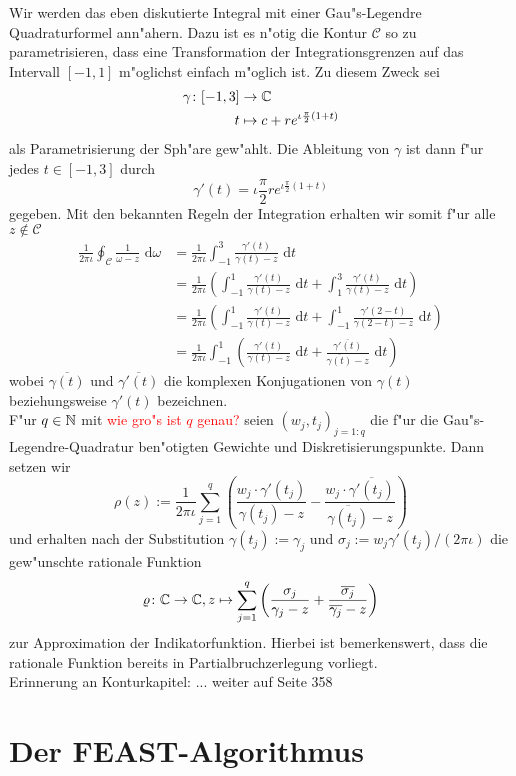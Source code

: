 Wir werden das eben diskutierte Integral mit einer Gau"s-Legendre Quadraturformel ann"ahern.
Dazu ist es n"otig die Kontur $\mathcal{C}$ so zu parametrisieren, dass eine Transformation
der Integrationsgrenzen auf das Intervall $[-1,1]$ m"oglichst einfach m"oglich ist. Zu diesem Zweck sei
\begin{align*}
\gamma\colon[-1,3]&\to\mathbb{C} \\
t&\mapsto c+re^{\iota \frac{\pi}{2}(1+t)}
\end{align*}
als Parametrisierung der Sph"are gew"ahlt. Die
Ableitung von $\gamma$ ist dann f"ur jedes $t\in[-1,3]$ durch
\[
\gamma'(t)=\iota \frac{\pi}{2}re^{\iota \frac{\pi}{2}(1+t)}
\]
gegeben. Mit den bekannten Regeln der Integration erhalten wir somit f"ur alle $z\notin\mathcal{C}$
\begin{align*}
\frac{1}{2\pi\iota}\oint_{ \mathcal{C}}\frac{1}{\omega-z}\text{ d}\omega
&= \frac{1}{2\pi\iota} \int_{-1}^3 \frac{\gamma'(t)}{\gamma(t)-z}\text{ d}t \\
&= \frac{1}{2\pi\iota} \left( \int_{-1}^1 \frac{\gamma'(t)}{\gamma(t)-z} \text{ d}t +
\int_{1}^3\frac{\gamma'(t)}{\gamma(t)-z}\text{ d}t \right) \\
&= \frac{1}{2\pi\iota} \left( \int_{-1}^1 \frac{\gamma'(t)}{\gamma(t)-z} \text{ d}t +
\int_{-1}^1\frac{\gamma'(2-t)}{\gamma(2-t)-z}\text{ d}t \right) \\
&= \frac{1}{2\pi\iota} \int_{-1}^1 \left( \frac{\gamma'(t)}{\gamma(t)-z} \text{ d}t +
\frac{\overline{\gamma'(t)}}{\overline{\gamma(t)}-z}\text{ d}t \right)
\end{align*}
wobei $\overline{\gamma(t)}$ und $\overline{\gamma'(t)}$ die komplexen Konjugationen
von $\gamma(t)$ beziehungsweise $\gamma'(t)$ bezeichnen.\\

F"ur $q\in\mathbb{N}$ mit \textcolor{red}{wie gro"s ist $q$ genau?} seien $(w_j, t_j)_{j=1:q}$
die f"ur die Gau"s-Legendre-Quadratur ben"otigten Gewichte und Diskretisierungspunkte.
Dann setzen wir
\[
\rho(z) := \frac{1}{2\pi\iota}\sum_{j=1}^q \left(
\frac{w_j \cdot \gamma'(t_j)}{\gamma(t_j)-z} - \frac{w_j \cdot \overline{\gamma'(t_j)}}{\overline{\gamma(t_j)}-z}
\right)
\]
und erhalten nach der Substitution $\gamma(t_j) := \gamma_j$ und
$\sigma_j := w_j \gamma'(t_j) / (2\pi\iota)$ die gew"unschte rationale
Funktion
\[
\varrho\colon\mathbb{C}\to\mathbb{C}, z\mapsto\sum_{j=1}^q\left(\frac{\sigma_j}{\gamma_j - z} +
\frac{\overline{\sigma_j}}{\overline{\gamma_j} - z}\right)
\]
zur Approximation der Indikatorfunktion. Hierbei ist bemerkenswert, dass die
rationale Funktion bereits in Partialbruchzerlegung vorliegt.\\

Erinnerung an Konturkapitel: ... weiter auf Seite 358
\section{Der FEAST-Algorithmus}
